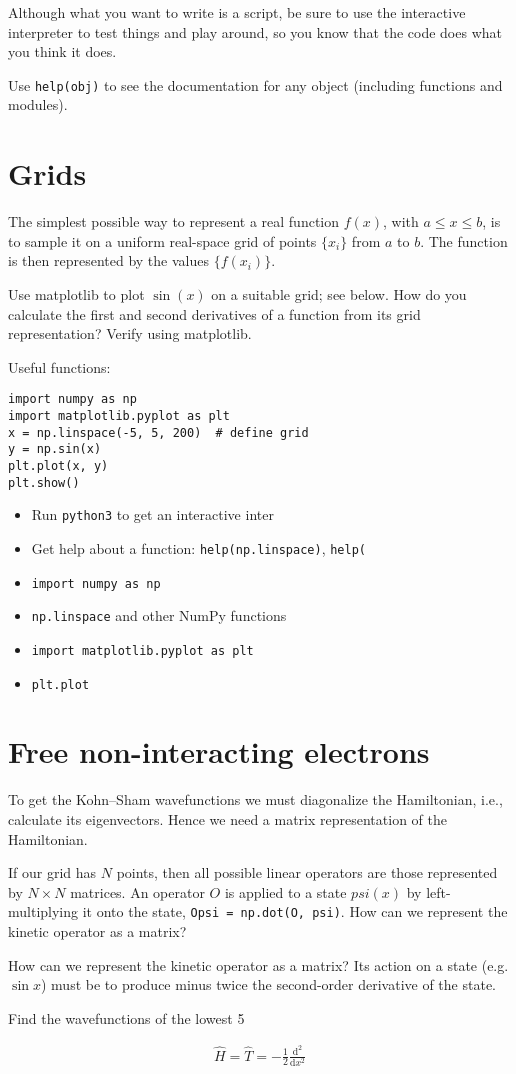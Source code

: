 \documentclass{article}
\newcommand{\diff}[2]{\frac{\mathrm d #1}{\mathrm d #2}}
\begin{document}
Although what you want to write is a script, be sure to use
the interactive interpreter to test things and play
around, so you know that the code does what you think it does.

Use \lstinline{help(obj)} to see the documentation for any object
(including functions and modules).

\section{Grids}

The simplest possible way to represent a real function $f(x)$,
with $a \le x \le b$, is to
sample it on a uniform real-space grid of points $\{x_i\}$ from $a$ to $b$.
The function is then represented by the values $\{f(x_i)\}$.

Use matplotlib to plot $\sin(x)$ on a suitable grid; see below.
How do you calculate the first and second derivatives of a function from
its grid representation?  Verify using matplotlib.

Useful functions:

\begin{lstlisting}
import numpy as np
import matplotlib.pyplot as plt
x = np.linspace(-5, 5, 200)  # define grid
y = np.sin(x)
plt.plot(x, y)
plt.show()
\end{lstlisting}



\begin{itemize}
\item Run \texttt{python3} to get an interactive inter
\item Get help about a function: \texttt{help(np.linspace)}, \texttt{help(}
\item \texttt{import numpy as np}
\item \texttt{np.linspace} and other NumPy functions
\item \texttt{import matplotlib.pyplot as plt}
\item \texttt{plt.plot} 
\end{itemize}

\section{Free non-interacting electrons}

To get the Kohn--Sham wavefunctions we must diagonalize the
Hamiltonian, i.e., calculate its eigenvectors.  Hence we need a matrix
representation of the Hamiltonian.

If our grid has $N$ points, then all possible linear operators are
those represented by $N\times N$ matrices.  An operator $O$ is applied
to a state $psi(x)$ by left-multiplying it onto the state,
\texttt{Opsi = np.dot(O, psi)}.  How can we represent the kinetic
operator as a matrix?

How can we represent the kinetic operator as a matrix?  Its action on
a state (e.g. $\sin x$) must be to produce minus twice the
second-order derivative of the state.

Find the wavefunctions of the lowest 5 

\begin{align}
  \hat H = \hat T = -\frac12 \diff{^2}{x^2}
\end{align}
\end{document}
